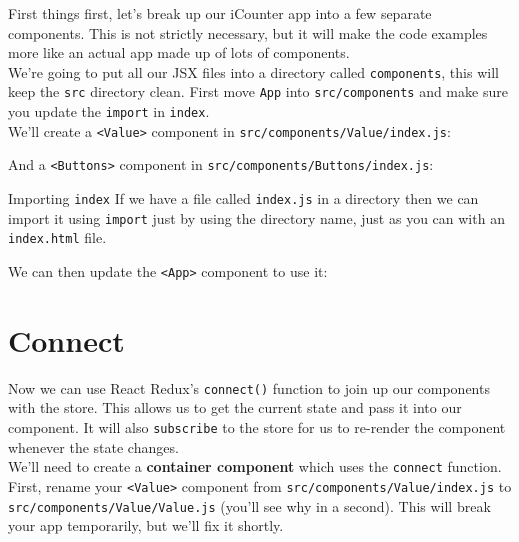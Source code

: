 First things first, let's break up our iCounter app into a few separate components. This is not strictly necessary, but it will make the code examples more like an actual app made up of lots of components.
\\

We're going to put all our JSX files into a directory called \texttt{components}, this will keep the \texttt{src} directory clean. First move \texttt{App} into \texttt{src/components} and make sure you update the \texttt{import} in \texttt{index}.
\\

We'll create a \texttt{<Value>} component in \texttt{src/components/Value/index.js}:


And a \texttt{<Buttons>} component in \texttt{src/components/Buttons/index.js}:



\begin{infobox}{Importing \texttt{index}}
    If we have a file called \texttt{index.js} in a directory then we can import it using \texttt{import} just by using the directory name, just as you can with an \texttt{index.html} file.
\end{infobox}

We can then update the \texttt{<App>} component to use it:




\section{Connect}

Now we can use React Redux's \texttt{connect()} function to join up our components with the store. This allows us to get the current state and pass it into our component. It will also \texttt{subscribe} to the store for us to re-render the component whenever the state changes.
\\

We'll need to create a \textbf{container component} which uses the \texttt{connect} function.
\\

First, rename your \texttt{<Value>} component from \texttt{src/components/Value/index.js} to \texttt{src/components/Value/Value.js} (you'll see why in a second). This will break your app temporarily, but we'll fix it shortly.
\\

